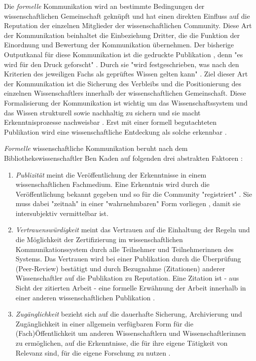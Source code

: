 Die \textit{formelle} Kommunikation wird an bestimmte Bedingungen der wissenschaftlichen Gemeinschaft geknüpft und hat einen direkten Einfluss auf die Reputation der einzelnen Mitglieder der wissenschaftlichen Community. Diese Art der Kommunikation beinhaltet die Einbeziehung Dritter, die die Funktion der Einordnung und Bewertung der Kommunikation übernehmen. Der bisherige Outputkanal für diese Kommunikation ist die gedruckte Publikation \cite{winkler_2011_anforderungen}, denn "es wird für den Druck geforscht" \cite{luhmann_1997_gesellschaft}. Durch sie "wird festgeschrieben, was nach den Kriterien des jeweiligen Fachs als geprüftes Wissen gelten kann" \cite{bbaw_publizieren_2015}. Ziel dieser Art der Kommunikation ist die Sicherung des Verbleibs und die Positionierung des einzelnen Wissenschaftlers innerhalb der wissenschaftlichen Gemeinschaft. Diese Formalisierung der Kommunikation ist wichtig um das Wissenschaftssystem und das Wissen strukturell sowie nachhaltig zu sichern und sie macht Erkenntnisprozesse nachweisbar \cite{kaden_2009_library}. Erst mit einer formell begutachteten Publikation wird eine wissenschaftliche Entdeckung als solche erkennbar \cite{brembs2015open}.

\textit{Formelle} wissenschaftliche Kommunikation beruht nach dem Bibliothekswissenschaftler Ben Kaden auf folgenden drei abstrakten Faktoren \cite{kaden_2009_library}:
\begin{enumerate}
\item \textit{Publizität} meint die Veröffentlichung der Erkenntnisse in einem wissenschaftlichen Fachmedium. Eine Erkenntnis wird durch die Veröffentlichung bekannt gegeben und so für die Community "registriert" \cite{kaden_2009_library} \cite[:5]{seidenfaden_2005_kommunikation}. Sie muss dabei "zeitnah" in einer "wahrnehmbaren" Form vorliegen \cite{Schimank_2012}, damit sie intersubjektiv vermittelbar ist.
\item \textit{Vertrauenswürdigkeit} meint das Vertrauen auf die Einhaltung der Regeln und die Möglichkeit der Zertifizierung \cite[:6]{seidenfaden_2005_kommunikation} im wissenschaftlichen Kommunikationssystem durch alle Teilnehmer und Teilnehmerinnen des Systems. Das Vertrauen wird bei einer Publikation durch die Überprüfung (Peer-Review) bestätigt und durch Bezugnahme (Zitationen) anderer Wissenschaftler auf die Publikation zu Reputation. Eine Zitation ist - aus Sicht der zitierten Arbeit - eine formelle Erwähnung der Arbeit innerhalb in einer anderen wissenschaftlichen Publikation \cite{weller2011twitter}.
\item \textit{Zugänglichkeit} bezieht sich auf die dauerhafte Sicherung, Archivierung \cite[:6]{seidenfaden_2005_kommunikation} und Zugänglichkeit in einer allgemein verfügbaren Form für die (Fach)Öffentlichkeit \cite{naeder_2010_open} um anderen Wissenschaftlern und Wissenschaftlerinnen zu ermöglichen, auf die Erkenntnisse, die für ihre eigene Tätigkeit von Relevanz sind, für die eigene Forschung zu nutzen \cite[:6]{seidenfaden_2005_kommunikation}.
\end{enumerate}

